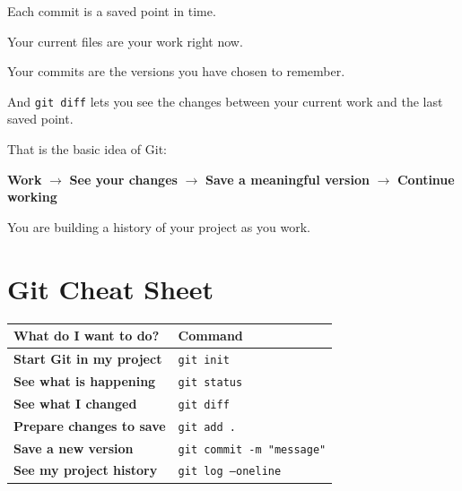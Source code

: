 \documentclass[11pt,a4paper]{article}
\begin{document}
Each commit is a saved point in time.

Your current files are your work right now.

Your commits are the versions you have chosen to remember.

And \texttt{git diff} lets you see the changes between your current work and the last saved point.

That is the basic idea of Git:

\begin{center}
\Large
\textbf{Work}
$\rightarrow$
\textbf{See your changes}
$\rightarrow$
\textbf{Save a meaningful version}
$\rightarrow$
\textbf{Continue working}
\end{center}

You are building a history of your project as you work.





\section{Git Cheat Sheet}

\begin{center}
\begin{tabular}{>{\bfseries}p{6cm} p{6cm}}
\toprule
What do I want to do? & Command\\
\midrule
Start Git in my project & \texttt{git init}\\
See what is happening & \texttt{git status}\\
See what I changed & \texttt{git diff}\\
Prepare changes to save & \texttt{git add .}\\
Save a new version & \texttt{git commit -m "message"}\\
See my project history & \texttt{git log --oneline}\\
\bottomrule
\end{tabular}
\end{center}

\end{document}
